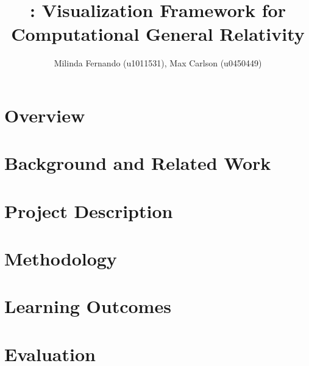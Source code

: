 \documentclass[a4paper,10pt]{article}
\title{\grvis : Visualization Framework for Computational General Relativity}
\author{Milinda Fernando (u1011531), Max Carlson (u0450449)}
\begin{document}
\maketitle

\section{Overview}


\section{Background and Related Work}


\section{Project Description}


\section{Methodology}


\section{Learning Outcomes}


\section{Evaluation}



\end{document}
